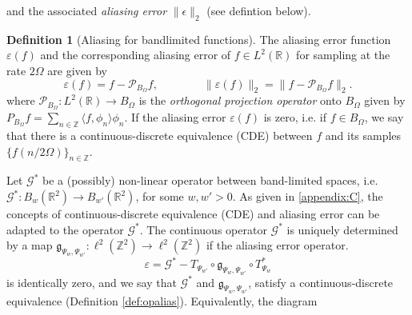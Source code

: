 \documentclass[reqno,10pt]{amsart}
\theoremstyle{plain}
\theoremstyle{definition}
\newtheorem{defn}{Definition}
\newcommand{\bb}[1]{\mathbb{#1}}
\newcommand{\cal}[1]{\mathcal{#1}}
\begin{document}
    and the associated {\it aliasing error} $\|\epsilon\|_2$  (see defintion below).
    \begin{defn}[Aliasing for bandlimited functions]
        The aliasing error function $\varepsilon(f)$ and the corresponding aliasing error of $f \in L^2(\bb R)$ for sampling at the rate $2\Omega$ are given by
        $$ \varepsilon(f) = f - \cal P_{B_\Omega}f, \qquad\qquad \|\varepsilon(f)\|_2 = \|f - \cal P_{B_\Omega}f\|_2.$$
        where $\cal P_{B_\Omega} : L^2(\bb R) \to B_\Omega$ is the {\it orthogonal projection operator} onto $B_\Omega$ given by $P_{B_\Omega}f = \sum_{n\in \bb Z}\langle f,\phi_n\rangle\phi_n$. If the aliasing error $\varepsilon(f)$ is zero, i.e. if $f \in B_\Omega$, we say that there is a continuous-discrete equivalence (CDE) between $f$ and its samples $\{f(n/2\Omega)\}_{n \in \bb Z}$.
    \end{defn}
    \noindent Let $\cal G^*$ be a (possibly) non-linear operator between band-limited spaces, i.e. $\cal G^* :B_w(\bb R^2) \to B_{w'}(\bb R^2)$, for some $w,w' > 0$. As given in \ref{appendix:C}, the concepts of continuous-discrete equivalence (CDE) and aliasing error can be adapted to the operator $\cal G^*$. The continuous operator $\cal G^*$ is uniquely determined by a map $\mathfrak{g}_{\Psi_w, \Psi_{w'}}:\ell^2(\bb Z^2) \to \ell^2(\bb Z^2)$ if the aliasing error operator.
    \begin{equation}\label{eq:opaliaserror}
        \varepsilon = \cal G^* - T_{\Psi_{w'}} \circ \mathfrak{g}_{\Psi_w, \Psi_{w'}} \circ T^*_{\Psi_w}
    \end{equation}
    is identically zero, and we say that $\cal G^*$ and $\mathfrak{g}_{\Psi_w, \Psi_{w'}}$, satisfy a continuous-discrete equivalence (Definition \ref{def:opalias}). Equivalently, the diagram \\
    \begin{figure}[!ht]
        \centering
        \caption{}
    \end{figure}
\end{document}
